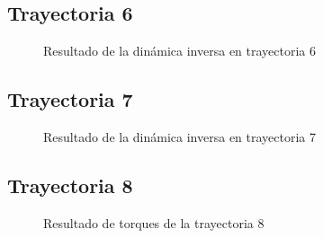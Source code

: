         \newpage

                
    \subsection{Trayectoria 6}
    
        \begin{figure}[h]
            \centering
            
            \caption{Resultado de la dinámica inversa en trayectoria 6}
            \label{f:cap7_tray6}
        \end{figure}
        

    \subsection{Trayectoria 7}
    
        \begin{figure}[h]
            \centering
            
            \caption{Resultado de la dinámica inversa en trayectoria 7}
            \label{f:cap7_tray7}
        \end{figure}


        \newpage
                
    \subsection{Trayectoria 8}
    
        \begin{figure}[h]
            \centering
            
            \caption{Resultado de torques de la trayectoria 8}
            \label{f:cap7_tray8}
        \end{figure}
        
        \newpage
        
\newpage
